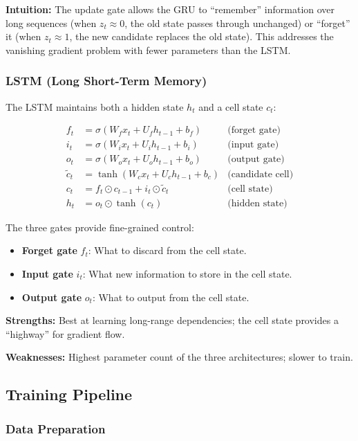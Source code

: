 \textbf{Intuition:} The update gate allows the GRU to ``remember'' information over long sequences (when $z_t \approx 0$, the old state passes through unchanged) or ``forget'' it (when $z_t \approx 1$, the new candidate replaces the old state). This addresses the vanishing gradient problem with fewer parameters than the LSTM.

\subsubsection{LSTM (Long Short-Term Memory)}

The LSTM maintains both a hidden state $h_t$ and a cell state $c_t$:

\begin{align}
f_t &= \sigma(W_f x_t + U_f h_{t-1} + b_f) & \text{(forget gate)} \\
i_t &= \sigma(W_i x_t + U_i h_{t-1} + b_i) & \text{(input gate)} \\
o_t &= \sigma(W_o x_t + U_o h_{t-1} + b_o) & \text{(output gate)} \\
\tilde{c}_t &= \tanh(W_c x_t + U_c h_{t-1} + b_c) & \text{(candidate cell)} \\
c_t &= f_t \odot c_{t-1} + i_t \odot \tilde{c}_t & \text{(cell state)} \\
h_t &= o_t \odot \tanh(c_t) & \text{(hidden state)}
\end{align}

The three gates provide fine-grained control:
\begin{itemize}
    \item \textbf{Forget gate} $f_t$: What to discard from the cell state.
    \item \textbf{Input gate} $i_t$: What new information to store in the cell state.
    \item \textbf{Output gate} $o_t$: What to output from the cell state.
\end{itemize}

\textbf{Strengths:} Best at learning long-range dependencies; the cell state provides a ``highway'' for gradient flow.

\textbf{Weaknesses:} Highest parameter count of the three architectures; slower to train.

\subsection{Training Pipeline}

\subsubsection{Data Preparation}


